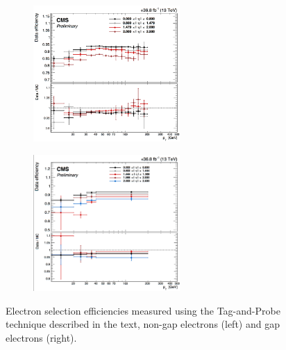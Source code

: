 \begin{figure}[tbh]
\centering
\begin{subfigure}{0.45\textwidth}
\centering
\includegraphics[width=2.2in]{Figures/Electrons/ele_eff_pt.pdf}
\caption{}
\end{subfigure}
\begin{subfigure}{0.45\textwidth}
\centering
\includegraphics[width=2.2in]{Figures/Electrons/gap_ele_eff_pt.pdf}
\caption{}
\end{subfigure}
\caption{Electron selection efficiencies measured using the Tag-and-Probe technique described in the text, non-gap electrons (left) and gap electrons (right).}
\label{fig:ele_sel_pt_turn_on}
\end{figure}


